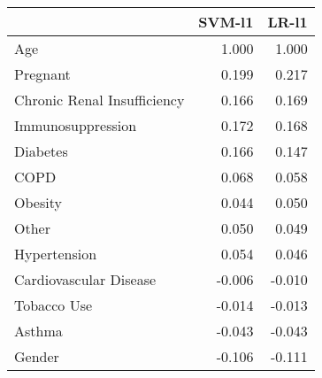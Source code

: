 \begin{tabular}{lrr}
\toprule
{} &  SVM-l1 &  LR-l1 \\
\midrule
Age                         &   1.000 &  1.000 \\
Pregnant                    &   0.199 &  0.217 \\
Chronic Renal Insufficiency &   0.166 &  0.169 \\
Immunosuppression           &   0.172 &  0.168 \\
Diabetes                    &   0.166 &  0.147 \\
COPD                        &   0.068 &  0.058 \\
Obesity                     &   0.044 &  0.050 \\
Other                       &   0.050 &  0.049 \\
Hypertension                &   0.054 &  0.046 \\
Cardiovascular Disease      &  -0.006 & -0.010 \\
Tobacco Use                 &  -0.014 & -0.013 \\
Asthma                      &  -0.043 & -0.043 \\
Gender                      &  -0.106 & -0.111 \\
\bottomrule
\end{tabular}
